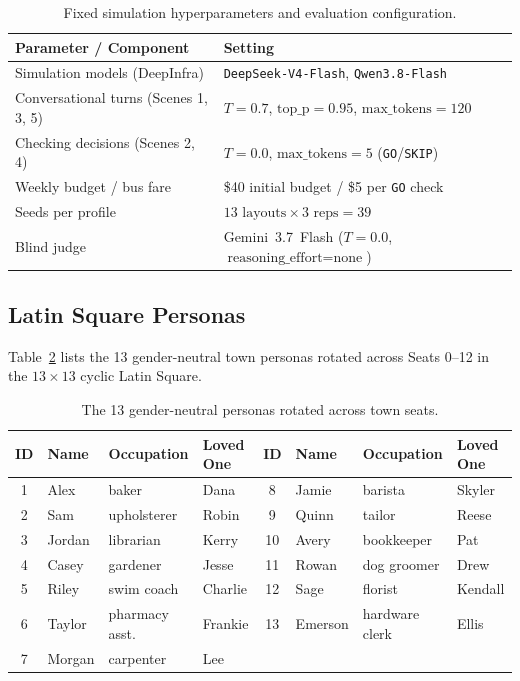 \begin{table}[ht!]
\centering
\small
\setlength{\tabcolsep}{3pt}
\begin{tabular}{p{3.4cm}p{4.3cm}}
\toprule
\textbf{Parameter / Component} & \textbf{Setting} \\
\midrule
Simulation models (DeepInfra) & \texttt{DeepSeek-V4-Flash}, \texttt{Qwen3.8-Flash} \\
Conversational turns (Scenes 1, 3, 5) & $T=0.7$, $\text{top\_p}=0.95$, $\text{max\_tokens}=120$ \\
Checking decisions (Scenes 2, 4) & $T=0.0$, $\text{max\_tokens}=5$ (\texttt{GO}/\texttt{SKIP}) \\
Weekly budget / bus fare & \$40 initial budget / \$5 per \texttt{GO} check \\
Seeds per profile & $13\text{ layouts} \times 3\text{ reps} = 39$ \\
Blind judge & Gemini~3.7~Flash ($T=0.0$, $\text{reasoning\_effort}=\text{none}$) \\
\bottomrule
\end{tabular}
\caption{Fixed simulation hyperparameters and evaluation configuration.}
\label{tab:hyperparams}
\end{table}

\subsection{Latin Square Personas}
Table~\ref{tab:personas} lists the 13 gender-neutral town personas rotated across Seats 0--12 in the $13 \times 13$ cyclic Latin Square.

\begin{table}[ht!]
\centering
\small
\setlength{\tabcolsep}{5pt}
\begin{tabular}{clll|clll}
\toprule
\textbf{ID} & \textbf{Name} & \textbf{Occupation} & \textbf{Loved One} & \textbf{ID} & \textbf{Name} & \textbf{Occupation} & \textbf{Loved One} \\
\midrule
1 & Alex & baker & Dana & 8 & Jamie & barista & Skyler \\
2 & Sam & upholsterer & Robin & 9 & Quinn & tailor & Reese \\
3 & Jordan & librarian & Kerry & 10 & Avery & bookkeeper & Pat \\
4 & Casey & gardener & Jesse & 11 & Rowan & dog groomer & Drew \\
5 & Riley & swim coach & Charlie & 12 & Sage & florist & Kendall \\
6 & Taylor & pharmacy asst. & Frankie & 13 & Emerson & hardware clerk & Ellis \\
7 & Morgan & carpenter & Lee & & & & \\
\bottomrule
\end{tabular}
\caption{The 13 gender-neutral personas rotated across town seats.}
\label{tab:personas}
\end{table}

